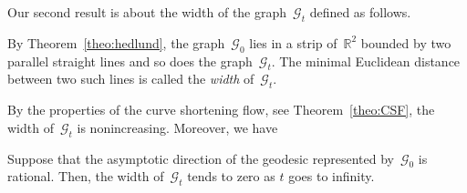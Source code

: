 \documentclass[AHL,Unicode,longabstracts,published]{cedram}
\newcommand{\GG}{\mathcal{G}}
\newcommand{\R}{\mathbb{R}}
\begin{document}
Our second result is about the width of the graph~$\GG_t$ defined as follows.

\begin{defi}
By Theorem~\ref{theo:hedlund}, the graph~$\GG_0$ lies in a strip of~$\R^2$ bounded by two parallel straight lines and so does the graph~$\GG_t$. The minimal Euclidean distance between two such lines is called the \emph{width} of~$\GG_t$.
\end{defi}

By the properties of the curve shortening flow, see Theorem~\ref{theo:CSF}, the width of~$\GG_t$ is nonincreasing. Moreover, we have

\begin{lemm}\label{lem:strip}
Suppose that the asymptotic direction of the geodesic represented by~$\GG_0$ is rational. Then, the width of~$\GG_t$ tends to zero as $t$ goes to infinity.
\end{lemm}
\end{document}
